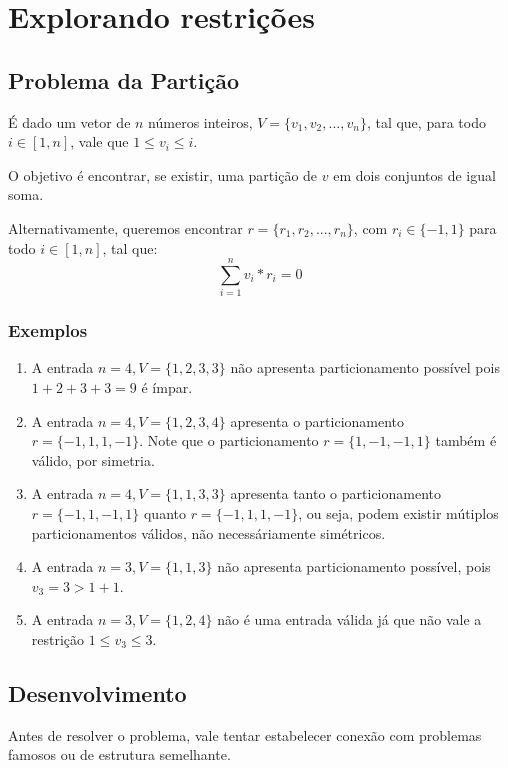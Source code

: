 \chapter{Explorando restrições}
\label{particao}

\section{Problema da Partição}

É dado um vetor de $n$ números inteiros, $V = \{v_1, v_2, ..., v_n\}$, tal que, para todo $i \in [1, n]$, vale que $1 \leq v_i \leq i$.

O objetivo é encontrar, se existir, uma partição de $v$ em dois conjuntos de igual soma.

Alternativamente, queremos encontrar $r = \{r_1, r_2, ..., r_n\}$, com $r_i \in \{-1, 1\}$ para todo $i \in [1, n]$, tal que:
$$\sum_{i = 1}^n v_i*r_i = 0$$

\subsection*{Exemplos}

\begin{enumerate}
    \item A entrada $n = 4, V = \{1, 2, 3, 3\}$ não apresenta particionamento possível pois $1 + 2 + 3 + 3 = 9$ é ímpar.
    \item A entrada $n = 4, V = \{1, 2, 3, 4\}$ apresenta o particionamento $r = \{-1, 1, 1, -1\}$. Note que o particionamento $r = \{1, -1, -1, 1\}$ também é válido, por simetria.
    \item A entrada $n = 4, V = \{1, 1, 3, 3\}$ apresenta tanto o particionamento $r = \{-1, 1, -1, 1\}$ quanto $r = \{-1, 1, 1, -1\}$, ou seja, podem existir mútiplos particionamentos válidos, não necessáriamente simétricos.
    \item A entrada $n = 3, V = \{1, 1, 3\}$ não apresenta particionamento possível, pois $v_3 = 3 > 1 + 1$.
    \item A entrada $n = 3, V = \{1, 2, 4\}$ não é uma entrada válida já que não vale a restrição $1 \leq v_3 \leq 3$.
\end{enumerate}

\section{Desenvolvimento}

Antes de resolver o problema, vale tentar estabelecer conexão com problemas famosos ou de estrutura semelhante.

